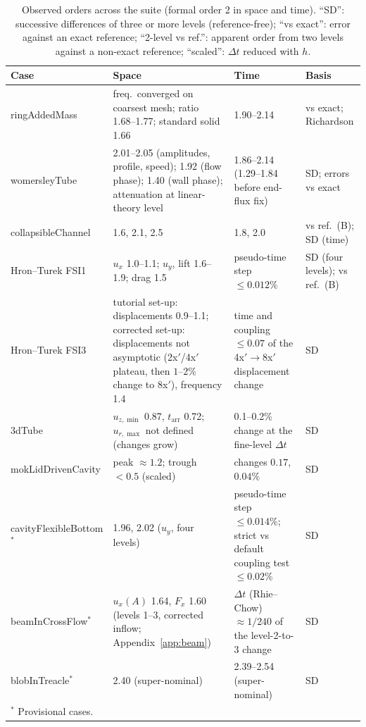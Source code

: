\begin{table}[htbp]
	\centering
	\footnotesize
	\setlength{\tabcolsep}{3pt}
	\caption{Observed orders across the suite (formal order 2 in space and time). ``SD'': successive differences of three or more levels (reference-free); ``vs exact'': error against an exact reference; ``2-level vs ref.'': apparent order from two levels against a non-exact reference; ``scaled'': $\Delta t$ reduced with $h$.}
	\label{tab:orders}
	\begin{tabular}{p{3.0cm}p{4.6cm}p{3.4cm}p{2.8cm}}
		\toprule
		Case & Space & Time & Basis \\
		\midrule
		ringAddedMass & freq.\ converged on coarsest mesh; ratio 1.68--1.77; standard solid 1.66 & 1.90--2.14 & vs exact; Richardson \\
		womersleyTube & 2.01--2.05 (amplitudes, profile, speed); 1.92 (flow phase); 1.40 (wall phase); attenuation at linear-theory level & 1.86--2.14 (1.29--1.84 before end-flux fix) & SD; errors vs exact \\
		collapsibleChannel & 1.6, 2.1, 2.5 & 1.8, 2.0 & vs ref.\ (B); SD (time) \\
		Hron--Turek FSI1 & $u_x$ 1.0--1.1; $u_y$, lift 1.6--1.9; drag 1.5 & pseudo-time step $\leq0.012\%$ & SD (four levels); vs ref.\ (B) \\
		Hron--Turek FSI3 & tutorial set-up: displacements 0.9--1.1; corrected set-up: displacements not asymptotic (2x$'$/4x$'$ plateau, then $1$--$2\%$ change to 8x$'$), frequency 1.4 & time and coupling $\leq0.07$ of the 4x$'\to$8x$'$ displacement change & SD \\
		3dTube & $u_{z,\min}$ 0.87, $t_\mathrm{arr}$ 0.72; $u_{r,\max}$ not defined (changes grow) & 0.1--0.2\% change at the fine-level $\Delta t$ & SD \\
		mokLidDrivenCavity & peak $\approx1.2$; trough $<0.5$ (scaled) & changes $0.17$, $0.04\%$ & SD \\
		cavityFlexibleBottom$^\ast$ & 1.96, 2.02 ($u_y$, four levels) & pseudo-time step $\leq0.014\%$; strict vs default coupling test $\leq0.02\%$ & SD \\
		beamInCrossFlow$^\ast$ & $u_x(A)$ 1.64, $F_x$ 1.60 (levels 1--3, corrected inflow; Appendix~\ref{app:beam}) & $\Delta t$ (Rhie--Chow) $\approx1/240$ of the level-2-to-3 change & SD \\
		blobInTreacle$^\ast$ & 2.40 (super-nominal) & 2.39--2.54 (super-nominal) & SD \\
		\bottomrule
		\multicolumn{4}{l}{$^\ast$ Provisional cases.}
	\end{tabular}
\end{table}

